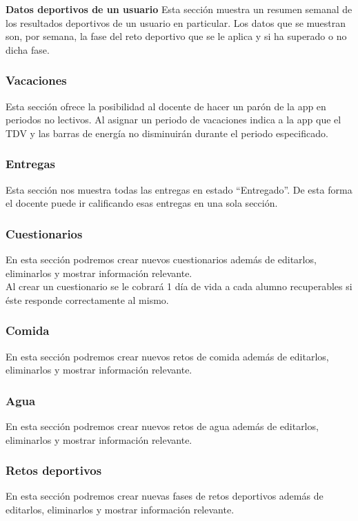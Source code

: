 \textbf{Datos deportivos de un usuario}
Esta sección muestra un resumen semanal de los resultados deportivos de un usuario en particular. Los datos que se muestran son, por semana, la fase del reto deportivo que se le aplica y si ha superado o no dicha fase.

\subsubsection{Vacaciones}
Esta sección ofrece la posibilidad al docente de hacer un parón de la app en periodos no lectivos. Al asignar un periodo de vacaciones indica a la app que el TDV y las barras de energía no disminuirán durante el periodo especificado.

\subsubsection{Entregas}
Esta sección nos muestra todas las entregas en estado ``Entregado''. De esta forma el docente puede ir calificando esas entregas en una sola sección.

\subsubsection{Cuestionarios}
En esta sección podremos crear nuevos cuestionarios además de editarlos, eliminarlos y mostrar información relevante.\\

Al crear un cuestionario se le cobrará 1 día de vida a cada alumno recuperables si éste responde correctamente al mismo.

\subsubsection{Comida}
En esta sección podremos crear nuevos retos de comida además de editarlos, eliminarlos y mostrar información relevante.\\

\subsubsection{Agua}
En esta sección podremos crear nuevos retos de agua además de editarlos, eliminarlos y mostrar información relevante.\\

\subsubsection{Retos deportivos}
En esta sección podremos crear nuevas fases de retos deportivos además de editarlos, eliminarlos y mostrar información relevante.\\

